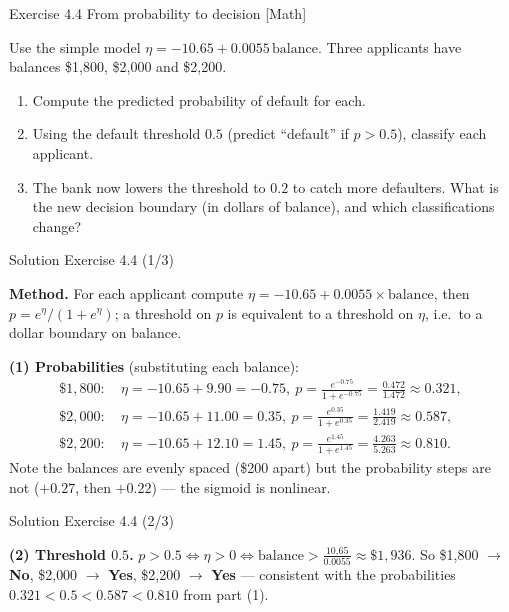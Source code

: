 \documentclass[aspectratio=169,11pt]{beamer}
\begin{document}
\begin{frame}{Exercise 4.4 \textemdash{} From probability to decision [Math]}
\begin{exercise}
Use the simple model $\eta = -10.65 + 0.0055\,\text{balance}$.
Three applicants have balances \$1{,}800, \$2{,}000 and \$2{,}200.
\begin{enumerate}
  \item Compute the predicted probability of default for each.
  \item Using the default threshold $0.5$ (predict ``default'' if
        $p>0.5$), classify each applicant.
  \item The bank now lowers the threshold to $0.2$ to catch more
        defaulters. What is the new decision boundary (in dollars of
        balance), and which classifications change?
\end{enumerate}
\end{exercise}
\end{frame}

\begin{frame}{Solution \textemdash{} Exercise 4.4 (1/3)}
\begin{solutionbox}
\textbf{Method.} For each applicant compute
$\eta=-10.65+0.0055\times\text{balance}$, then
$p=e^{\eta}/(1+e^{\eta})$; a threshold on $p$ is equivalent to a
threshold on $\eta$, i.e.\ to a dollar boundary on balance.

\vspace{1mm}
\textbf{(1) Probabilities} (substituting each balance):
\[
\begin{aligned}
  \$1{,}800:&\ \eta=-10.65+9.90=-0.75,\ p=\tfrac{e^{-0.75}}{1+e^{-0.75}}
              =\tfrac{0.472}{1.472}\approx 0.321,\\
  \$2{,}000:&\ \eta=-10.65+11.00=0.35,\ p=\tfrac{e^{0.35}}{1+e^{0.35}}
              =\tfrac{1.419}{2.419}\approx 0.587,\\
  \$2{,}200:&\ \eta=-10.65+12.10=1.45,\ p=\tfrac{e^{1.45}}{1+e^{1.45}}
              =\tfrac{4.263}{5.263}\approx 0.810.
\end{aligned}
\]
Note the balances are evenly spaced (\$200 apart) but the probability
steps are not ($+0.27$, then $+0.22$) --- the sigmoid is nonlinear.
\end{solutionbox}
\end{frame}

\begin{frame}{Solution \textemdash{} Exercise 4.4 (2/3)}
\begin{solutionbox}
\textbf{(2) Threshold $0.5$.}
$p>0.5 \iff \eta>0 \iff \text{balance} > \tfrac{10.65}{0.0055}
\approx \$1{,}936$. So
\$1{,}800 $\to$ \textbf{No}, \$2{,}000 $\to$ \textbf{Yes},
\$2{,}200 $\to$ \textbf{Yes} --- consistent with the probabilities
$0.321 < 0.5 < 0.587 < 0.810$ from part (1).

\vspace{1mm}
\end{solutionbox}
\end{frame}
\end{document}
